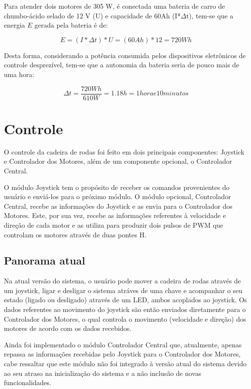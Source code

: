   Para atender dois motores de 305 W, é conectada uma bateria de carro de chumbo-ácido selado de 12 V (U) e capacidade de 60Ah (I*$\Delta$t), tem-se que a energia $E$ gerada pela bateria é de:

  \begin{equation}
  E = (I*\Delta t)*U = (60Ah)*12 = 720Wh
  \end{equation}

  Desta forma, considerando a potência consumida pelos dispositivos eletrônicos de controle desprezível, tem-se que a autonomia da bateria seria de pouco mais de uma hora:

  \begin{equation}
  \Delta t = \frac{720 Wh}{610 W} = 1.18 h = 1 hora e 10 minutos
  \end{equation}

\section{Controle}

  O controle da cadeira de rodas foi feito em dois principais componentes: Joystick e Controlador dos Motores, além de um componente opcional, o Controlador Central.

  O módulo Joystick tem o propósito de receber os comandos provenientes do usuário e enviá-los para o próximo módulo. O módulo opcional, Controlador Central, recebe as informações do Joystick e as envia para o Controlador dos Motores. Este, por sua vez, recebe as informações referentes à velocidade e direção de cada motor e as utiliza para produzir dois pulsos de PWM que controlam os motores através de duas pontes H.

\subsection{Panorama atual}

  Na atual versão do sistema, o usuário pode mover a cadeira de rodas através de um joystick, ligar e desligar o sistema atráves de uma chave e acompanhar o seu estado (ligado ou desligado) através de um LED, ambos acoplados ao joystick. Os dados referentes ao movimento do joystick são então enviados diretamente para o Controlador dos Motores, o qual controla o movimento (velocidade e direção) dos motores de acordo com os dados recebidos.

  Ainda foi implementado o módulo Controlador Central que, atualmente, apenas repassa as informações recebidas pelo Joystick para o Controlador dos Motores, cabe ressaltar que este módulo não foi integrado à versão atual do sistema devido ao seu atraso na inicialização do sistema e a não inclusão de novas funcionalidades.


